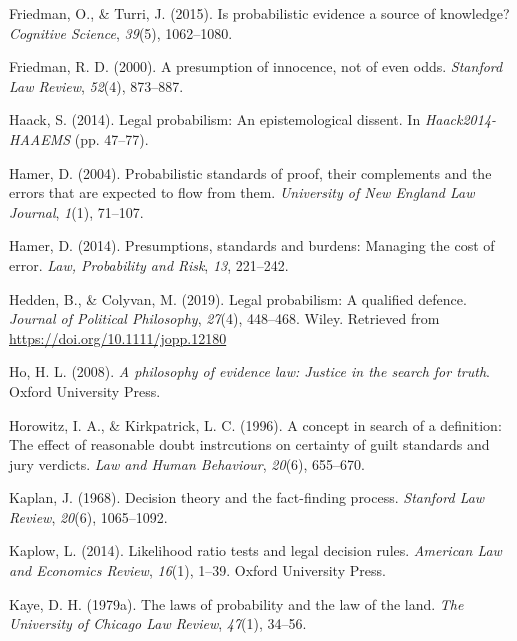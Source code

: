 \documentclass[10pt,dvipsnames,enabledeprecatedfontcommands]{scrartcl}
\begin{document}
\leavevmode\hypertarget{ref-friedman2015}{}%
Friedman, O., \& Turri, J. (2015). Is probabilistic evidence a source of
knowledge? \emph{Cognitive Science}, \emph{39}(5), 1062--1080.

\leavevmode\hypertarget{ref-Friedman2000presumption}{}%
Friedman, R. D. (2000). A presumption of innocence, not of even odds.
\emph{Stanford Law Review}, \emph{52}(4), 873--887.

\leavevmode\hypertarget{ref-haack2011legal}{}%
Haack, S. (2014). Legal probabilism: An epistemological dissent. In
\emph{Haack2014-HAAEMS} (pp. 47--77).

\leavevmode\hypertarget{ref-hamer2004}{}%
Hamer, D. (2004). Probabilistic standards of proof, their complements
and the errors that are expected to flow from them. \emph{University of
New England Law Journal}, \emph{1}(1), 71--107.

\leavevmode\hypertarget{ref-hamer2014}{}%
Hamer, D. (2014). Presumptions, standards and burdens: Managing the cost
of error. \emph{Law, Probability and Risk}, \emph{13}, 221--242.

\leavevmode\hypertarget{ref-HeddenColyvan2019legal}{}%
Hedden, B., \& Colyvan, M. (2019). Legal probabilism: A qualified
defence. \emph{Journal of Political Philosophy}, \emph{27}(4), 448--468.
Wiley. Retrieved from \url{https://doi.org/10.1111/jopp.12180}

\leavevmode\hypertarget{ref-ho2008philosophy}{}%
Ho, H. L. (2008). \emph{A philosophy of evidence law: Justice in the
search for truth}. Oxford University Press.

\leavevmode\hypertarget{ref-Horowitz1996}{}%
Horowitz, I. A., \& Kirkpatrick, L. C. (1996). A concept in search of a
definition: The effect of reasonable doubt instrcutions on certainty of
guilt standards and jury verdicts. \emph{Law and Human Behaviour},
\emph{20}(6), 655--670.

\leavevmode\hypertarget{ref-Kaplan1968decision}{}%
Kaplan, J. (1968). Decision theory and the fact-finding process.
\emph{Stanford Law Review}, \emph{20}(6), 1065--1092.

\leavevmode\hypertarget{ref-kaplow2014likelihood}{}%
Kaplow, L. (2014). Likelihood ratio tests and legal decision rules.
\emph{American Law and Economics Review}, \emph{16}(1), 1--39. Oxford
University Press.

\leavevmode\hypertarget{ref-kaye79}{}%
Kaye, D. H. (1979a). The laws of probability and the law of the land.
\emph{The University of Chicago Law Review}, \emph{47}(1), 34--56.
\end{document}
